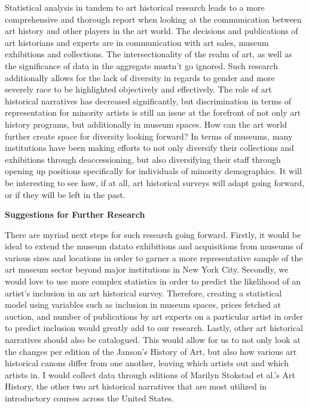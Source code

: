\documentclass[
  letterpaper,
  DIV=11,
  numbers=noendperiod]{scrreprt}
\begin{document}
Statistical analysis in tandem to art historical research leads to a
more comprehensive and thorough report when looking at the communication
between art history and other players in the art world. The decisions
and publications of art historians and experts are in communication with
art sales, museum exhibitions and collections. The intersectionality of
the realm of art, as well as the significance of data in the aggregate
mustn't go ignored. Such research additionally allows for the lack of
diversity in regards to gender and more severely race to be highlighted
objectively and effectively. The role of art historical narratives has
decreased significantly, but discrimination in terms of representation
for minority artists is still an issue at the forefront of not only art
history programs, but additionally in museum spaces. How can the art
world further create space for diversity looking forward? In terms of
museums, many institutions have been making efforts to not only
diversify their collections and exhibitions through deaccessioning, but
also diversifying their staff through opening up positions specifically
for individuals of minority demographics. It will be interesting to see
how, if at all, art historical surveys will adapt going forward, or if
they will be left in the past.~

\textbf{Suggestions for Further Research}

There are myriad next steps for such research going forward. Firstly, it
would be ideal to extend the museum datato exhibitions and acquisitions
from museums of various sizes and locations in order to garner a more
representative sample of the art museum sector beyond major institutions
in New York City. Secondly, we would love to use more complex statistics
in order to predict the likelihood of an artist's inclusion in an art
historical survey. Therefore, creating a statistical model using
variables such as inclusion in museum spaces, prices fetched at auction,
and number of publications by art experts on a particular artist in
order to predict inclusion would greatly add to our research. Lastly,
other art historical narratives should also be catalogued. This would
allow for us to not only look at the changes per edition of the Janson's
History of Art, but also how various art historical canons differ from
one another, leaving which artists out and which artists in. I would
collect data through editions of Marilyn Stokstad et al.'s Art History,
the other two art historical narratives that are most utilized in
introductory courses across the United States.
\end{document}
